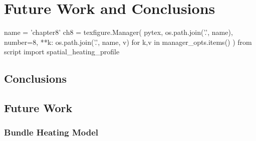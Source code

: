 \chapter{Future Work and Conclusions}\label{ch:conclusions}

\begin{pycode}[chapter8]
name = 'chapter8'
ch8 = texfigure.Manager(
    pytex,
    os.path.join('.', name),
    number=8,
    **{k: os.path.join('.', name, v) for k,v in manager_opts.items()}
)
from script import spatial_heating_profile
\end{pycode}

\section{Conclusions}\label{sec:conclusions}


\section{Future Work}\label{sec:future-work}

\subsection{Bundle Heating Model}\label{sec:bundle}

